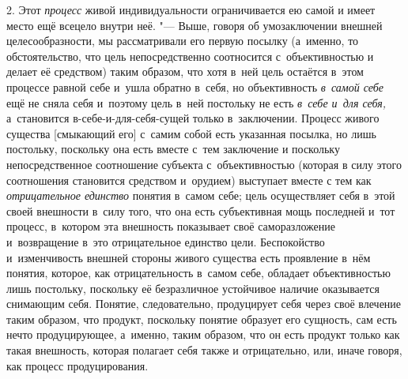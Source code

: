 2. Этот {\em процесс} живой индивидуальности ограничивается ею самой и
имеет место ещё всецело внутри неё. "--- Выше, говоря об умозаключении
внешней целесообразности, мы рассматривали его первую посылку (а~именно, то
обстоятельство, что цель непосредственно соотносится с~объективностью и
делает её средством) таким образом, что хотя в~ней цель остаётся в~этом
процессе равной себе и~ушла обратно в~себя, но объективность
{\em в~самой себе} ещё не сняла себя и~поэтому цель в~ней постольку не есть
{\em в~себе и~для себя,}
а~становится в-себе-и-для-себя-сущей только в~заключении.
Процесс живого существа [смыкающий его] с~самим собой есть указанная
посылка, но лишь постольку, поскольку она есть вместе с~тем заключение и
поскольку непосредственное соотношение субъекта с~объективностью (которая в
силу этого соотношения становится средством и~орудием) выступает вместе с
тем как {\em отрицательное единство}
понятия в~самом себе; цель осуществляет себя в~этой своей
внешности в~силу того, что она есть субъективная мощь последней и~тот
процесс, в~котором эта внешность показывает своё саморазложение
и~возвращение в~это отрицательное единство цели.
Беспокойство и~изменчивость внешней стороны живого существа есть проявление
в~нём понятия, которое, как отрицательность в~самом себе, обладает
объективностью лишь постольку, поскольку её безразличное устойчивое наличие
оказывается снимающим себя. Понятие, следовательно, продуцирует себя через
своё влечение таким образом, что продукт, поскольку понятие образует его
сущность, сам есть нечто продуцирующее, а~именно, таким образом, что он
есть продукт только как такая внешность, которая полагает себя также и
отрицательно, или, иначе говоря, как процесс продуцирования.


